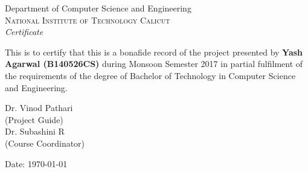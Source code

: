 \newpage
\thispagestyle{empty}

\begin{center}

\huge{Department of Computer Science and Engineering}\\[0.5cm]
\normalsize
\textsc{National Institute of Technology Calicut}\\[2.0cm]

\emph{\LARGE Certificate}\\[2.5cm]
\end{center}
\normalsize This is to certify that this is a bonafide record of the project presented by \textbf{Yash Agarwal (B140526CS)} during Monsoon Semester 2017 in partial fulfilment of the requirements of the degree of Bachelor of Technology in Computer Science and Engineering.\\[1.0cm]



\begin{flushright}
Dr. Vinod Pathari\\
(Project Guide)\\[1.5cm]
Dr. Subashini R\\
(Course Coordinator)\\
\end{flushright}

\begin{flushleft}
Date: \today
\end{flushleft}
